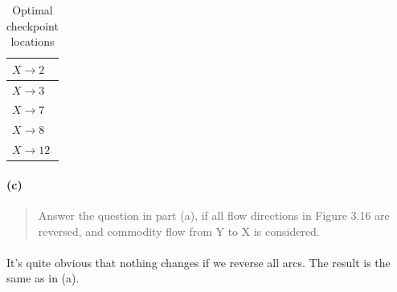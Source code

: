 \begin{table}[H]
\centering
\begin{tabular}{|l|}
\hline
$X \rightarrow 2$ \\ \hline
$X \rightarrow 3$ \\ \hline
$X \rightarrow 7$ \\ \hline
$X \rightarrow 8$ \\ \hline
$X \rightarrow 12$ \\ \hline
\end{tabular}
\caption{Optimal checkpoint locations}
\label{mincut3-6b}
\end{table}

\paragraph{(c)}
\begin{quote}
Answer the question in part (a), if all flow directions in Figure 3.16 are reversed, and commodity flow from Y to X is considered.
\end{quote}

\paragraph{}
It's quite obvious that nothing changes if we reverse all arcs. The result is the same as in (a).
